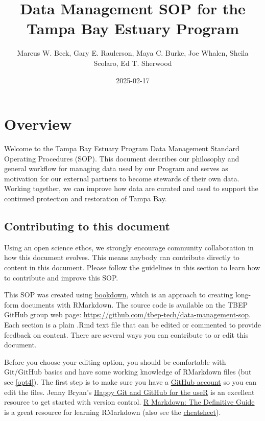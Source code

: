 \documentclass[
]{book}
\title{Data Management SOP for the Tampa Bay Estuary Program}
\author{Marcus W. Beck, Gary E. Raulerson, Maya C. Burke, Joe Whalen, Sheila Scolaro, Ed T. Sherwood}
\date{2025-02-17}
\begin{document}
\maketitle

{
\hypersetup{linkcolor=}
\setcounter{tocdepth}{1}
\tableofcontents
}
\chapter{Overview}\label{overview}

Welcome to the Tampa Bay Estuary Program Data Management Standard Operating Procedures (SOP). This document describes our philosophy and general workflow for managing data used by our Program and serves as motivation for our external partners to become stewards of their own data. Working together, we can improve how data are curated and used to support the continued protection and restoration of Tampa Bay.

\section{Contributing to this document}\label{contrib}

Using an open science ethos, we strongly encourage community collaboration in how this document evolves. This means anybody can contribute directly to content in this document. Please follow the guidelines in this section to learn how to contribute and improve this SOP.

This SOP was created using \href{https://bookdown.org/}{bookdown}, which is an approach to creating long-form documents with RMarkdown. The source code is available on the TBEP GitHub group web page: \url{https://github.com/tbep-tech/data-management-sop}. Each section is a plain .Rmd text file that can be edited or commented to provide feedback on content. There are several ways you can contribute to or edit this document.

Before you choose your editing option, you should be comfortable with Git/GitHub basics and have some working knowledge of RMarkdown files (but see \ref{opt4}). The first step is to make sure you have a \href{https://github.com/join}{GitHub account} so you can edit the files. Jenny Bryan's \href{https://happygitwithr.com/}{Happy Git and GitHub for the useR} is an excellent resource to get started with version control. \href{https://bookdown.org/yihui/rmarkdown/}{R Markdown: The Definitive Guide} is a great resource for learning RMarkdown (also see the \href{https://rstudio.com/wp-content/uploads/2015/03/rmarkdown-reference.pdf}{cheatsheet}).
\end{document}
